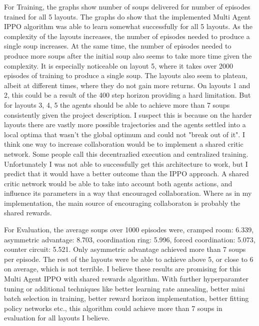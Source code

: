 \documentclass[conference]{IEEEtran}
\begin{document}
For Training, the graphs show number of soups delivered for number of episodes trained for all 5 layouts. 
The graphs do show that the implemented Multi Agent IPPO algorithm was able to learn somewhat successfully for all 5 layouts. 
As the complexity of the layouts increases, the number of episodes needed to produce a single soup increases. At the same time, the number of episodes
needed to produce more soups after the initial soup also seems to take more time given the complexity. It is especially noticeable on 
layout 5, where it takes over 2000 episodes of training to produce a single soup. The layouts also seem to plateau, albeit at different times, where they do not 
gain more returns. On layouts 1 and 2, this could be a result of the 400 step horizon providing a hard limitation. But for layouts 3, 4, 5 the agents
should be able to achieve more than 7 soups consistently given the project description. I suspect this is because on the harder layouts there are 
vastly more possible trajectories and the agents settled into a local optima that wasn't the global optimum and could not "break out of it". I think 
one way to increase collaboration would be to implement a shared critic network. Some people call this decentrazlied execution and centralized training.
Unfortunately I was not able to successfully get this architecture to work, but I predict that it would have a better outcome than the IPPO approach.
A shared critic network would be able to take into account both agents actions, and influence its parameters in a way that encouraged collaboration.
Where as in my implementation, the main source of encouraging collaboraton is probably the shared rewards. \par
For Evaluation, the average soups over 1000 episodes were, cramped room: 6.339, asymmetric advantage: 8.703,  
coordination ring: 5.996, forced coordination: 5.073, counter circuit: 5.521. Only asymmetric advantage achieved more than 7 soups per episode.
The rest of the layouts were be able to achieve above 5, or close to 6 on average, which is not terrible. I believe these results are promising for 
this Multi Agent IPPO with shared rewards algorithm. With further hyperparamter tuning or additional techniques like better learning rate annealing, 
better mini batch selection in training, better reward horizon implementation, better fitting policy networks etc.,
this algorithm could achieve more than 7 soups in evaluation for all layouts I believe. 
\end{document}
